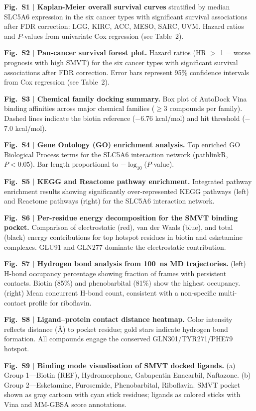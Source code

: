 \documentclass[pdflatex,sn-nature]{sn-jnl}
\begin{document}
\noindent\textbf{Fig.~S1} \textbf{| Kaplan-Meier overall survival curves} stratified by median SLC5A6 expression in the six cancer types with significant survival associations after FDR correction: LGG, KIRC, ACC, MESO, SARC, UVM. Hazard ratios and $P$-values from univariate Cox regression (see Table~2).

\noindent\textbf{Fig.~S2} \textbf{| Pan-cancer survival forest plot.} Hazard ratios (HR $>$ 1 = worse prognosis with high SMVT) for the six cancer types with significant survival associations after FDR correction. Error bars represent 95\% confidence intervals from Cox regression (see Table~2).

\noindent\textbf{Fig.~S3} \textbf{| Chemical family docking summary.} Box plot of AutoDock Vina binding affinities across major chemical families ($\ge$3 compounds per family). Dashed lines indicate the biotin reference ($-$6.76 kcal/mol) and hit threshold ($-$7.0 kcal/mol).

\noindent\textbf{Fig.~S4} \textbf{| Gene Ontology (GO) enrichment analysis.} Top enriched GO Biological Process terms for the SLC5A6 interaction network (pathlinkR, $P < 0.05$). Bar length proportional to $-\log_{10}$($P$-value).

\noindent\textbf{Fig.~S5} \textbf{| KEGG and Reactome pathway enrichment.} Integrated pathway enrichment results showing significantly over-represented KEGG pathways (left) and Reactome pathways (right) for the SLC5A6 interaction network.

\noindent\textbf{Fig.~S6} \textbf{| Per-residue energy decomposition for the SMVT binding pocket.} Comparison of electrostatic (red), van der Waals (blue), and total (black) energy contributions for top hotspot residues in biotin and esketamine complexes. GLU91 and GLN277 dominate the electrostatic contribution.

\noindent\textbf{Fig.~S7} \textbf{| Hydrogen bond analysis from 100~ns MD trajectories.} (left) H-bond occupancy percentage showing fraction of frames with persistent contacts. Biotin (85\%) and phenobarbital (81\%) show the highest occupancy. (right) Mean concurrent H-bond count, consistent with a non-specific multi-contact profile for riboflavin.

\noindent\textbf{Fig.~S8} \textbf{| Ligand--protein contact distance heatmap.} Color intensity reflects distance (\AA{}) to pocket residue; gold stars indicate hydrogen bond formation. All compounds engage the conserved GLN301/TYR271/PHE79 hotspot.

\noindent\textbf{Fig.~S9} \textbf{| Binding mode visualisation of SMVT docked ligands.} (a) Group 1---Biotin (REF), Hydromorphone, Gabapentin Enacarbil, Naftazone. (b) Group 2---Esketamine, Furosemide, Phenobarbital, Riboflavin. SMVT pocket shown as gray cartoon with cyan stick residues; ligands as colored sticks with Vina and MM-GBSA score annotations.
\end{document}
